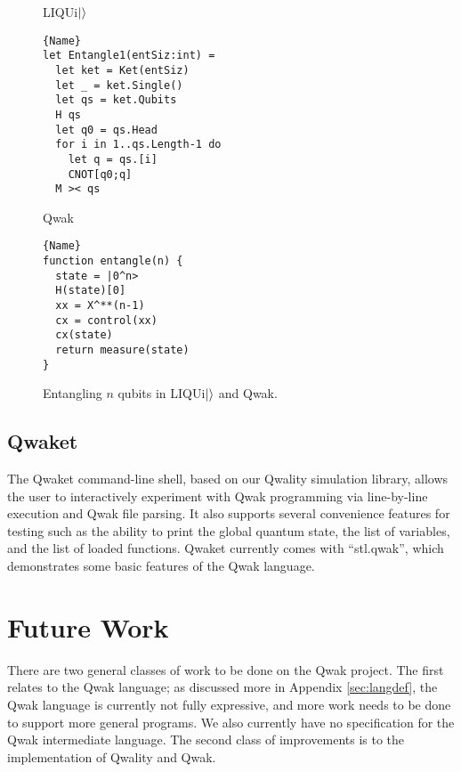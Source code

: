 \documentclass{article}
\begin{document}
\begin{figure}
\noindent\hspace*{\fill}\begin{minipage}[t]{.4\textwidth}
\centerline{LIQUi$\ket{}$}
\begin{lstlisting}[frame=tlrb,language=liquid]{Name}
let Entangle1(entSiz:int) =
  let ket = Ket(entSiz)
  let _ = ket.Single()
  let qs = ket.Qubits
  H qs
  let q0 = qs.Head
  for i in 1..qs.Length-1 do
    let q = qs.[i]
    CNOT[q0;q]
  M >< qs
\end{lstlisting}
\end{minipage}\hfill
\begin{minipage}[t]{.4\textwidth}
\centerline{Qwak}
\begin{lstlisting}[frame=tlrb]{Name}
function entangle(n) {
  state = |0^n>
  H(state)[0]
  xx = X^**(n-1)
  cx = control(xx)
  cx(state)
  return measure(state)
}
\end{lstlisting}
\end{minipage}\hspace*{\fill}
\caption{Entangling $n$ qubits in LIQUi$\ket{}$ and Qwak.} \label{fig:lang-comparison}
\end{figure}

\subsection{Qwaket}

The Qwaket command-line shell, based on our Qwality simulation library, allows the user to interactively experiment with Qwak programming via line-by-line execution and Qwak file parsing. It also supports several convenience features for testing such as the ability to print the global quantum state, the list of variables, and the list of loaded functions. Qwaket currently comes with ``stl.qwak'', which demonstrates some basic features of the Qwak language.

\section{Future Work}

There are two general classes of work to be done on the Qwak project. The first relates to the Qwak language; as discussed more in Appendix \ref{sec:langdef}, the Qwak language is currently not fully expressive, and more work needs to be done to support more general programs. We also currently have no specification for the Qwak intermediate language. The second class of improvements is to the implementation of Qwality and Qwak.
\end{document}
